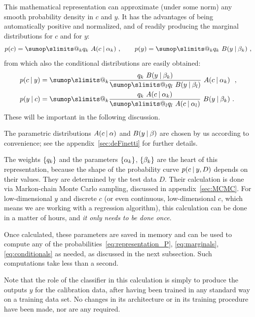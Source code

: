 \documentclass[\ifafour a4paper,12pt,\else a5paper,10pt,\fi%
onecolumn,oneside,article,%
british%
]{memoir}
\makeatletter
\theoremstyle{remark}
\theoremstyle{innote}
\def\sum{\DOTSI\sumop\slimits@}
\DeclarePairedDelimiter\set{\{}{\}} %
\renewcommand*{\|}[1][]{\nonscript\:#1\vert\nonscript\:\mathopen{}}
\makeatother
\begin{document}
This mathematical representation can approximate (under some norm) any smooth probability density in $c$ and $y$. It has the advantages of being automatically positive and normalized, and of readily producing the marginal distributions for $c$ and for $y$:
\begin{equation}
  \label{eq:marginals}
  p(c) = \sum_{k} q_{k}\ A(c \| \alpha_{k})\ ,
  \qquad
  p(y) = \sum_{k} q_{k}\ B(y \| \beta_{k}) \ ,
\end{equation}
from which also the conditional distributions are easily obtained:
\begin{subequations} \label{eq:conditionals}
  \begin{align}
    \label{eq:conditional_c_given_y}
    p(c \| y) &= \sum_{k} \frac{q_{k}\ B(y \| \beta_{k})
                }{\sum_{l} q_{l}\ B(y \| \beta_{l})}\
                A(c \| \alpha_{k})\  \ ,
    \\
    \label{eq:conditional_y_given_c}
    p(y \| c) &= \sum_{k} \frac{q_{k}\ A(c \| \alpha_{k})
                }{\sum_{l} q_{l}\ A(c \| \alpha_{l})}\
                B(y \| \beta_{k}) \ .
  \end{align}
\end{subequations}
These will be important in the following discussion.

The parametric distributions $A(c \| \alpha)$ and $B(y \| \beta)$ are chosen by us according to convenience; see the appendix~\ref{sec:deFinetti} for further details.
\medskip

The weights $\set{q_{k}}$ and the parameters $\set{\alpha_{k}}$, $\set{\beta_{k}}$ are the heart of this representation, because the shape of the probability curve $p(c \| y, D)$ depends on their values. They are determined by the test data $D$. Their calculation is done via Markon-chain Monte Carlo sampling, discussed in appendix~\ref{sec:MCMC}. For low-dimensional $y$ and discrete $c$ (or even continuous, low-dimensional $c$, which means we are working with a regression algorithm), this calculation can be done in a matter of hours, and \emph{it only needs to be done once}.

Once calculated, these parameters are saved in memory and can be used to compute any of the probabilities~\eqref{eq:representation_P}, \eqref{eq:marginals}, \eqref{eq:conditionals} as needed, as discussed in the next subsection. Such computations take less than a second.

Note that the role of the classifier in this calculation is simply to produce the outputs $y$ for the calibration data, after having been trained in any standard way on a training data set. No changes in its architecture or in its training procedure have been made, nor are any required.
\end{document}
